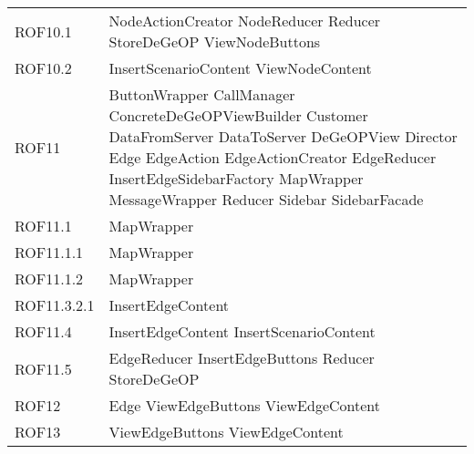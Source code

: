 \begin{longtable}{p{2.5cm}!{\VRule[1pt]}p{5cm}}
		ROF10.1 & NodeActionCreator \newline NodeReducer \newline Reducer \newline StoreDeGeOP \newline ViewNodeButtons\\
		ROF10.2 & InsertScenarioContent \newline ViewNodeContent\\
		ROF11 & ButtonWrapper \newline CallManager \newline ConcreteDeGeOPViewBuilder \newline Customer \newline DataFromServer \newline DataToServer \newline DeGeOPView \newline Director \newline Edge \newline EdgeAction \newline EdgeActionCreator \newline EdgeReducer \newline InsertEdgeSidebarFactory \newline MapWrapper \newline MessageWrapper \newline Reducer \newline Sidebar \newline SidebarFacade\\
		ROF11.1 & MapWrapper\\
		ROF11.1.1 & MapWrapper\\
		ROF11.1.2 & MapWrapper\\
		ROF11.3.2.1 & InsertEdgeContent\\
		ROF11.4 & InsertEdgeContent \newline InsertScenarioContent\\
		ROF11.5 & EdgeReducer \newline InsertEdgeButtons \newline Reducer \newline StoreDeGeOP\\
		ROF12 & Edge \newline ViewEdgeButtons \newline ViewEdgeContent\\
		ROF13 & ViewEdgeButtons \newline ViewEdgeContent\\

\end{longtable}
